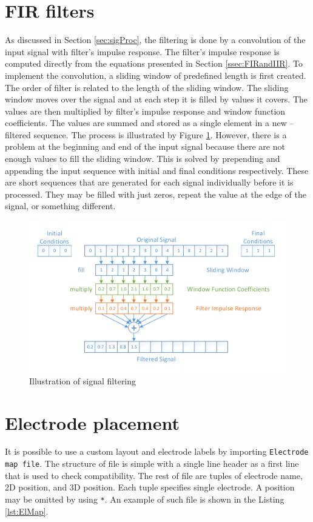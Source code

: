 \section{FIR filters}
\label{sec:implFIRfilters}
As discussed in Section \ref{sec:sigProc}, the filtering is done by a convolution of the input signal with filter's impulse response. The filter's impulse response is computed directly from the equations presented in Section \ref{ssec:FIRandIIR}. To implement the convolution, a sliding window of predefined length is first created. The order of filter is related to the length of the sliding window. The sliding window moves over the signal and at each step it is filled by values it covers. The values are then multiplied by filter's impulse response and window function coefficients. The values are summed and stored as a single element in a new -- filtered sequence. The process is illustrated by Figure \ref{fig:ImplFilter}. However, there is a problem at the beginning and end of the input signal because there are not enough values to fill the sliding window. This is solved by prepending and appending the input sequence with initial and final conditions respectively. These are short sequences that are generated for each signal individually before it is processed. They may be filled with just zeros, repeat the value at the edge of the signal, or something different.  

\begin{figure}[ht]
	\centering
	\includegraphics[width=1\linewidth]{fig/implFilter.pdf}
	\caption{Illustration of signal filtering}
	\label{fig:ImplFilter}
\end{figure}

\section{Electrode placement}
\label{sec:ImplElPlacement}
It is possible to use a custom layout and electrode labels by importing \texttt{Electrode map file}. The structure of file is simple with a single line header as a first line that is used to check compatibility. The rest of file are tuples of electrode name, 2D position, and 3D position. Each tuple specifies single electrode. A position may be omitted by using \texttt{*}. An example of such file is shown in the Listing \ref{lst:ElMap}.

